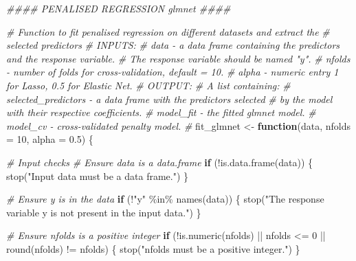 \documentclass[
  11pt,
]{article}
\newenvironment{Shaded}{}{}
\newcommand{\AttributeTok}[1]{\textcolor[rgb]{0.49,0.56,0.16}{#1}}
\newcommand{\CommentTok}[1]{\textcolor[rgb]{0.38,0.63,0.69}{\textit{#1}}}
\newcommand{\ControlFlowTok}[1]{\textcolor[rgb]{0.00,0.44,0.13}{\textbf{#1}}}
\newcommand{\DecValTok}[1]{\textcolor[rgb]{0.25,0.63,0.44}{#1}}
\newcommand{\DocumentationTok}[1]{\textcolor[rgb]{0.73,0.13,0.13}{\textit{#1}}}
\newcommand{\FloatTok}[1]{\textcolor[rgb]{0.25,0.63,0.44}{#1}}
\newcommand{\FunctionTok}[1]{\textcolor[rgb]{0.02,0.16,0.49}{#1}}
\newcommand{\NormalTok}[1]{#1}
\newcommand{\OtherTok}[1]{\textcolor[rgb]{0.00,0.44,0.13}{#1}}
\newcommand{\SpecialCharTok}[1]{\textcolor[rgb]{0.25,0.44,0.63}{#1}}
\newcommand{\StringTok}[1]{\textcolor[rgb]{0.25,0.44,0.63}{#1}}
\begin{document}
\begin{Shaded}
\begin{Highlighting}[]
\DocumentationTok{\#\#\#\# PENALISED REGRESSION \textquotesingle{}glmnet\textquotesingle{} \#\#\#\#}

\CommentTok{\# Function to fit penalised regression on different datasets and extract the }
\CommentTok{\#   selected predictors}
\CommentTok{\# INPUTS:}
\CommentTok{\#         data {-} a data frame containing the predictors and the response variable.}
\CommentTok{\#                The response variable should be named "y".}
\CommentTok{\#         nfolds {-} number of folds for cross{-}validation, default = 10.}
\CommentTok{\#         alpha {-} numeric entry 1 for Lasso, 0.5 for Elastic Net.}
\CommentTok{\# OUTPUT:}
\CommentTok{\#         A list containing:}
\CommentTok{\#               selected\_predictors {-} a data frame with the predictors selected }
\CommentTok{\#                                     by the model with their respective coefficients.}
\CommentTok{\#               model\_fit {-} the fitted glmnet model.}
\CommentTok{\#               model\_cv {-} cross{-}validated penalty model.}
\CommentTok{\#}
\NormalTok{fit\_glmnet }\OtherTok{\textless{}{-}} \ControlFlowTok{function}\NormalTok{(data, }\AttributeTok{nfolds =} \DecValTok{10}\NormalTok{, }\AttributeTok{alpha =} \FloatTok{0.5}\NormalTok{) \{}
  
  \CommentTok{\# Input checks}
  \CommentTok{\# Ensure data is a data.frame}
  \ControlFlowTok{if}\NormalTok{ (}\SpecialCharTok{!}\FunctionTok{is.data.frame}\NormalTok{(data)) \{}
    \FunctionTok{stop}\NormalTok{(}\StringTok{"Input \textquotesingle{}data\textquotesingle{} must be a data frame."}\NormalTok{)}
\NormalTok{  \}}
  
  \CommentTok{\# Ensure \textquotesingle{}y\textquotesingle{} is in the data}
  \ControlFlowTok{if}\NormalTok{ (}\SpecialCharTok{!}\StringTok{"y"} \SpecialCharTok{\%in\%} \FunctionTok{names}\NormalTok{(data)) \{}
    \FunctionTok{stop}\NormalTok{(}\StringTok{"The response variable \textquotesingle{}y\textquotesingle{} is not present in the input data."}\NormalTok{)}
\NormalTok{  \}}
  
  \CommentTok{\# Ensure \textquotesingle{}nfolds\textquotesingle{} is a positive integer}
  \ControlFlowTok{if}\NormalTok{ (}\SpecialCharTok{!}\FunctionTok{is.numeric}\NormalTok{(nfolds) }\SpecialCharTok{||}\NormalTok{ nfolds }\SpecialCharTok{\textless{}=} \DecValTok{0} \SpecialCharTok{||} \FunctionTok{round}\NormalTok{(nfolds) }\SpecialCharTok{!=}\NormalTok{ nfolds) \{}
    \FunctionTok{stop}\NormalTok{(}\StringTok{"\textquotesingle{}nfolds\textquotesingle{} must be a positive integer."}\NormalTok{)}
\NormalTok{  \}}
  

\end{Highlighting}
\end{Shaded}
\end{document}
